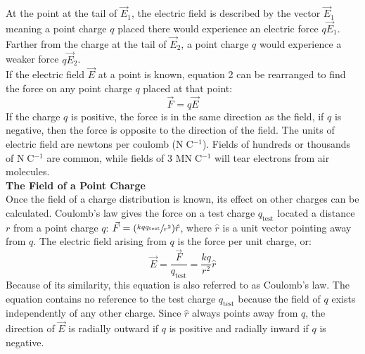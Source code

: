 \documentclass[a4paper]{article}
\let\bf\textbf
\begin{document}
At the point at the tail of $\vec{E}_1$, the electric field is described by the vector $\vec{E}_1$ meaning a point charge $q$ placed there would experience an electric force $q\vec{E}_1$. Farther from the charge at the tail of $\vec{E}_2$, a point charge $q$ would experience a weaker force $q\vec{E}_2$.
\vspace{1mm}\\
If the electric field $\vec{E}$ at a point is known, equation 2 can be rearranged to find the force on any point charge $q$ placed at that point:
\begin{equation*}
    \vec{F} = q\vec{E}
\end{equation*}
If the charge $q$ is positive, the force is in the same direction as the field, if $q$ is negative, then the force is opposite to the direction of the field. The units of electric field are newtons per coulomb (N$\;$C$^{-1}$). Fields of hundreds or thousands of N$\;$C$^{-1}$ are common, while fields of 3 MN$\;$C$^{-1}$ will tear electrons from air molecules.
\vspace{1mm}\\
\bf{The Field of a Point Charge}
\vspace{1mm}\\
Once the field of a charge distribution is known, its effect on other charges can be calculated. Coulomb's law gives the force on a test charge $q_{\text{test}}$ located a distance $r$ from a point charge $q$: $\vec{F} = (\sfrac{kqq_{\text{test}}}{r^2})\hat{r}$, where $\hat{r}$ is a unit vector pointing away from $q$. The electric field arising from $q$ is the force per unit charge, or:
\begin{equation}
    \vec{E} = \frac{\vec{F}}{q_{\text{test}}} = \frac{kq}{r^2}\hat{r}
\end{equation}
Because of its similarity, this equation is also referred to as Coulomb's law. The equation contains no reference to the test charge $q_{\text{test}}$ because the field of $q$ exists independently of any other charge. Since $\hat{r}$ always points away from $q$, the direction of $\vec{E}$ is radially outward if $q$ is positive and radially inward if $q$ is negative.
\begin{center}
\end{center}
\newpage
\end{document}
